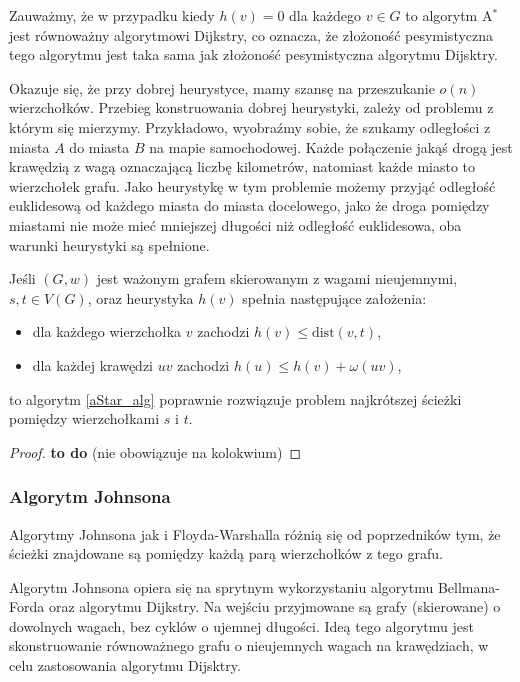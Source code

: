 Zauważmy, że w przypadku kiedy $h(v) = 0$ dla każdego $v \in G$ 
to algorytm A$^*$ jest równoważny algorytmowi Dijkstry, co oznacza, że
złożoność pesymistyczna tego algorytmu jest taka sama jak złożoność
pesymistyczna algorytmu Dijsktry.

Okazuje się, że przy dobrej heurystyce, mamy szansę na 
przeszukanie $o(n)$ wierzchołków. Przebieg konstruowania
dobrej heurystyki, zależy od problemu z którym się mierzymy. 
Przykładowo, wyobraźmy sobie, że szukamy odległości z miasta $A$
do miasta $B$ na mapie samochodowej. Każde połączenie jakąś drogą
jest krawędzią z wagą oznaczającą liczbę kilometrów, natomiast
każde miasto to wierzchołek grafu. Jako heurystykę w tym problemie 
możemy przyjąć odległość euklidesową od każdego miasta
do miasta docelowego, jako że droga pomiędzy miastami nie może mieć 
mniejszej długości niż odległość euklidesowa, oba warunki
heurystyki są spełnione.

\begin{theorem}
	 Jeśli
	$(G, w)$ jest ważonym grafem skierowanym
	z wagami nieujemnymi,
	$s,t \in V(G)$, oraz heurystyka $h(v)$
	spełnia następujące założenia:
	\begin{itemize}
		\item dla każdego wierzchołka $v$ zachodzi $h(v) \leq \text{dist}(v, t)$,
		\item dla każdej krawędzi $uv$ zachodzi $h(u) \leq h(v) + \omega(uv)$,
	\end{itemize}
	to algorytm \ref{aStar_alg}
	poprawnie rozwiązuje problem najkrótszej ścieżki
	pomiędzy wierzchołkami $s$ i $t$.
	\begin{proof}
		\textbf{to do} (nie obowiązuje na kolokwium)
	\end{proof}
	\label{aStar_proof}
\end{theorem}

\subsubsection{Algorytm Johnsona}
Algorytmy Johnsona jak i Floyda-Warshalla 
różnią się od poprzedników tym, że
ścieżki znajdowane są pomiędzy każdą parą
wierzchołków z tego grafu.

Algorytm Johnsona opiera się na sprytnym wykorzystaniu
algorytmu Bellmana-Forda oraz algorytmu Dijkstry. Na 
wejściu przyjmowane są grafy (skierowane) o dowolnych
wagach, bez cyklów o ujemnej długości. Ideą tego
algorytmu jest skonstruowanie równoważnego 
grafu o nieujemnych wagach na krawędziach,
w celu zastosowania algorytmu Dijsktry.

